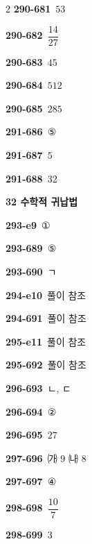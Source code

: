 \documentclass[10pt,a4paper]{article}
\begin{document}
\begin{multicols}{2}
\noindent\textbf{290-681}\ $53$\par
\noindent\textbf{290-682}\ $\dfrac{14}{27}$\par
\noindent\textbf{290-683}\ $45$\par
\noindent\textbf{290-684}\ $512$\par
\noindent\textbf{290-685}\ $285$\par
\noindent\textbf{291-686}\ ⑤\par
\noindent\textbf{291-687}\ $5$\par
\noindent\textbf{291-688}\ $32$\par
\noindent\textbf{32 수학적 귀납법}\par\smallskip
\noindent\textbf{293-e9}\ ①\par
\noindent\textbf{293-689}\ ⑤\par
\noindent\textbf{293-690}\ ㄱ\par
\noindent\textbf{294-e10}\ 풀이 참조\par
\noindent\textbf{294-691}\ 풀이 참조\par
\noindent\textbf{295-e11}\ 풀이 참조\par
\noindent\textbf{295-692}\ 풀이 참조\par
\noindent\textbf{296-693}\ ㄴ, ㄷ\par
\noindent\textbf{296-694}\ ②\par
\noindent\textbf{296-695}\ $27$\par
\noindent\textbf{297-696}\ ㈎ $9$ ㈏ $8$\par
\noindent\textbf{297-697}\ ④\par
\noindent\textbf{298-698}\ $\dfrac{10}{7}$\par
\noindent\textbf{298-699}\ $3$\par
\end{multicols}
\end{document}
